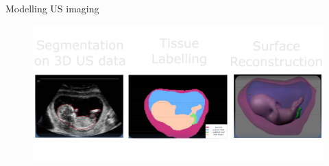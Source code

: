 

{


\begin{frame}{Modelling US imaging}
      \begin{figure}
        \centering
        \includegraphics[width=1.0\textwidthfigures]{./figures/modelling-us-imaging/versions/drawing-v02}
      \end{figure}
\end{frame}
}



